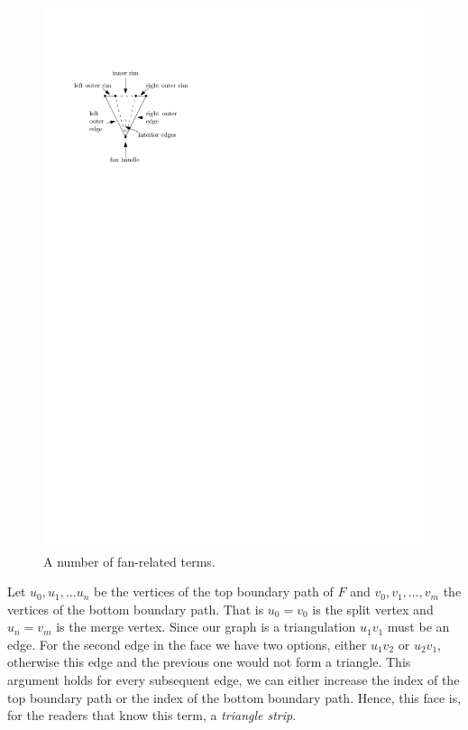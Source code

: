     \begin{figure}[b]
      \centering
      \includegraphics[scale=1]{rectangularDuals/img/fanterms}
      \caption{A number of fan-related terms.}
      \label{fig:rect:fanTerms}
    \end{figure}

    Let $u_0 , u_1, \ldots u_n$ be the vertices of the top boundary path of $F$ and $v_0, v_1, \ldots, v_m$ the vertices of the bottom boundary path.
    That is $u_0=v_0$ is the split vertex and $u_n = v_m$ is the merge vertex.
    Since our graph is a triangulation $u_1v_1$ must be an edge.
    For the second edge in the face we have two options, either $u_1v_2$ or $u_2v_1$, otherwise this edge and the previous one would not form a triangle.
    This argument holds for every subsequent edge, we can either increase the index of the top boundary path or the index of the bottom boundary path.
    Hence, this face is, for the readers that know this term, a \emph{triangle strip}.


